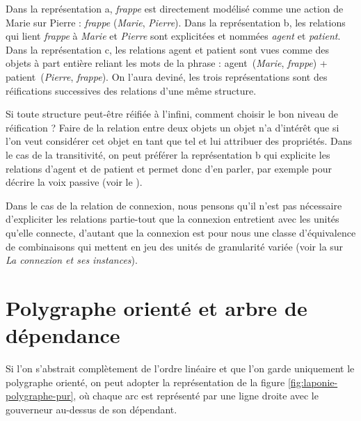 {    Dans la représentation a, \textit{frappe} est directement modélisé comme une action de Marie sur Pierre : \textit{frappe} (\textit{Marie}, \textit{Pierre}). Dans la représentation b, les relations qui lient \textit{frappe} à \textit{Marie} et \textit{Pierre} sont explicitées et nommées \textit{agent} et \textit{patient}. Dans la représentation c, les relations agent et patient sont vues comme des objets à part entière reliant les mots de la phrase : agent~(\textit{Marie}, \textit{frappe}) + patient~(\textit{Pierre}, \textit{frappe}). On l’aura deviné, les trois représentations sont des réifications successives des relations d’une même structure.

    Si toute structure peut-être réifiée à l’infini, comment choisir le bon niveau de réification ? Faire de la relation entre deux objets un objet n’a d’intérêt que si l’on veut considérer cet objet en tant que tel et lui attribuer des propriétés. Dans le cas de la transitivité, on peut préférer la représentation b qui explicite les relations d’agent et de patient et permet donc d’en parler, par exemple pour décrire la voix passive (voir le ).

    Dans le cas de la relation de connexion, nous pensons qu’il n’est pas nécessaire d’expliciter les relations partie-tout que la connexion entretient avec les unités qu’elle connecte, d'autant que la connexion est pour nous une classe d'équivalence de combinaisons qui mettent en jeu des unités de granularité variée (voir la  sur \textit{La connexion et ses instances}).}

\section{Polygraphe orienté et arbre de dépendance}\label{sec:3.4.23}

Si l’on s’abstrait complètement de l’ordre linéaire et que l’on garde uniquement le polygraphe orienté, on peut adopter la représentation de la figure \ref{fig:laponie-polygraphe-pur}, où chaque arc est représenté par une ligne droite avec le gouverneur au-dessus de son dépendant.

